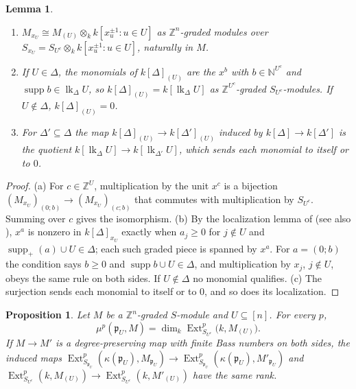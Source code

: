 \documentclass[11pt]{article}
\theoremstyle{plain}
\newtheorem{lemma}[theorem]{Lemma}
\newtheorem{proposition}[theorem]{Proposition}
\theoremstyle{definition}
\newcommand{\kk}{k}
\newcommand{\ZZ}{\mathbb{Z}}
\newcommand{\NN}{\mathbb{N}}
\newcommand{\pp}{\mathfrak{p}}
\newcommand{\link}{\operatorname{lk}}
\newcommand{\Ext}{\operatorname{Ext}}
\newcommand{\supp}{\operatorname{supp}}
\begin{document}
\begin{lemma}\label{lem:star-loc}
\begin{enumerate}[label=\textup{(\alph*)},nosep]
\item $M_{x_U}\cong M_{(U)}\otimes_\kk\kk[x_u^{\pm1}:u\in U]$ as $\ZZ^n$-graded modules over
$S_{x_U}=S_{U^c}\otimes_\kk\kk[x_u^{\pm1}:u\in U]$, naturally in $M$.
\item If $U\in\Delta$, the monomials of $\kk[\Delta]_{(U)}$ are the $x^b$ with $b\in\NN^{U^c}$ and
$\supp b\in\link_\Delta U$, so $\kk[\Delta]_{(U)}=\kk[\link_\Delta U]$ as $\ZZ^{U^c}$-graded $S_{U^c}$-modules.
If $U\notin\Delta$, $\kk[\Delta]_{(U)}=0$.
\item For $\Delta'\subseteq\Delta$ the map $\kk[\Delta]_{(U)}\to\kk[\Delta']_{(U)}$ induced by
$\kk[\Delta]\to\kk[\Delta']$ is the quotient $\kk[\link_\Delta U]\to\kk[\link_{\Delta'}U]$, which sends each
monomial to itself or to $0$.
\end{enumerate}
\end{lemma}

\begin{proof}
(a) For $c\in\ZZ^U$, multiplication by the unit $x^c$ is a bijection $(M_{x_U})_{(0;b)}\to(M_{x_U})_{(c;b)}$
that commutes with multiplication by $S_{U^c}$. Summing over $c$ gives the isomorphism.
(b) By the localization lemma of \cite{HeSuwayyidWei} (see also \cite[Lemma~5.3.6]{BrunsHerzog}), $x^a$ is nonzero in
$\kk[\Delta]_{x_U}$ exactly when $a_j\ge0$ for $j\notin U$ and $\supp_+(a)\cup U\in\Delta$; each such
graded piece is spanned by $x^a$. For $a=(0;b)$ the condition says $b\ge0$ and $\supp b\cup U\in\Delta$, and
multiplication by $x_j$, $j\notin U$, obeys the same rule on both sides. If $U\notin\Delta$ no monomial qualifies.
(c) The surjection sends each monomial to itself or to $0$, and so does its localization.
\end{proof}

\begin{proposition}\label{prop:bass-reduction}
Let $M$ be a $\ZZ^n$-graded $S$-module and $U\subseteq[n]$. For every $p$,
\[
\mu^p(\pp_U,M)=\dim_\kk\Ext^p_{S_{U^c}}\bigl(\kk,M_{(U)}\bigr).
\]
If $M\to M'$ is a degree-preserving map with finite Bass numbers on both sides, the induced maps
$\Ext^p_{S_{\pp_U}}(\kappa(\pp_U),M_{\pp_U})\to\Ext^p_{S_{\pp_U}}(\kappa(\pp_U),M'_{\pp_U})$ and
$\Ext^p_{S_{U^c}}(\kk,M_{(U)})\to\Ext^p_{S_{U^c}}(\kk,M'_{(U)})$ have the same rank.
\end{proposition}
\end{document}
